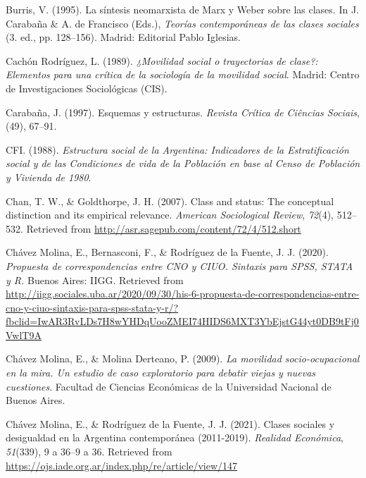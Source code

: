\documentclass[
]{article}
\newlength{\cslhangindent}
\newlength{\cslentryspacingunit} %
\newenvironment{CSLReferences}[2] %
 {%
  \setlength{\parindent}{0pt}
  \ifodd #1
  \let\oldpar\par
  \def\par{\hangindent=\cslhangindent\oldpar}
  \fi
  \setlength{\parskip}{#2\cslentryspacingunit}
 }%
 {}
\begin{document}
\begin{CSLReferences}{1}{0}
\leavevmode{}%
Burris, V. (1995). La síntesis neomarxista de {Marx} y {Weber} sobre las clases. In J. Carabaña \& A. de Francisco (Eds.), \emph{Teorías contemporáneas de las clases sociales} (3. ed., pp. 128--156). Madrid: Editorial Pablo Iglesias.

\leavevmode{}%
Cachón Rodríguez, L. (1989). \emph{¿{Movilidad} social o trayectorias de clase?: Elementos para una crítica de la sociología de la movilidad social}. Madrid: Centro de Investigaciones Sociológicas (CIS).

\leavevmode{}%
Carabaña, J. (1997). Esquemas y estructuras. \emph{Revista Crítica de Ciências Sociais}, (49), 67--91.

\leavevmode{}%
CFI. (1988). \emph{Estructura social de la {Argentina}: Indicadores de la {Estratificación} social y de las {Condiciones} de vida de la {Población} en base al {Censo} de {Población} y {Vivienda} de 1980}.

\leavevmode{}%
Chan, T. W., \& Goldthorpe, J. H. (2007). Class and status: The conceptual distinction and its empirical relevance. \emph{American Sociological Review}, \emph{72}(4), 512--532. Retrieved from \url{http://asr.sagepub.com/content/72/4/512.short}

\leavevmode{}%
Chávez Molina, E., Bernasconi, F., \& Rodríguez de la Fuente, J. J. (2020). \emph{Propuesta de correspondencias entre {CNO} y {CIUO}. {Sintaxis} para {SPSS}, {STATA} y {R}.} Buenos Aires: IIGG. Retrieved from \url{http://iigg.sociales.uba.ar/2020/09/30/his-6-propuesta-de-correspondencias-entre-cno-y-ciuo-sintaxis-para-spss-stata-y-r/?fbclid=IwAR3RvLDs7H8wYHDqUooZMEI74HIDS6MXT3YbEjstG44yt0DB9tFj0VwlT9A}

\leavevmode{}%
Chávez Molina, E., \& Molina Derteano, P. (2009). \emph{La movilidad socio-ocupacional en la mira. {Un} estudio de caso exploratorio para debatir viejas y nuevas cuestiones}. Facultad de Ciencias Económicas de la Universidad Nacional de Buenos Aires.

\leavevmode{}%
Chávez Molina, E., \& Rodríguez de la Fuente, J. J. (2021). Clases sociales y desigualdad en la {Argentina} contemporánea (2011-2019). \emph{Realidad Económica}, \emph{51}(339), 9 a 36--9 a 36. Retrieved from \url{https://ojs.iade.org.ar/index.php/re/article/view/147}


\end{CSLReferences}
\end{document}
